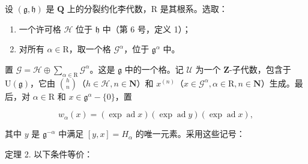设 \((\mathfrak{g},\mathfrak{h})\) 是 \(\mathbf{Q}\) 上的分裂约化李代数，\(\mathrm{R}\) 是其根系。选取：

\begin{enumerate}
\def\labelenumi{\alph{enumi})}
\item
  一个许可格 \(\mathcal{H}\) 位于 \(\mathfrak{h}\) 中（第 6 号，定义 1）；
\item
  对所有 \(\alpha \in \mathrm{R}\)，取一个格 \(\mathcal{G}^{\alpha}\)，位于 \(\mathfrak{g}^{\alpha}\) 中。
\end{enumerate}

置 \(\mathcal{G} = \mathcal{H} \oplus \sum_{\alpha \in \mathrm{R}} \mathcal{G}^{\alpha}\)。这是 \(\mathfrak{g}\) 中的一个格。记 \(\mathcal{U}\) 为一个 \(\mathbf{Z}\)-子代数，包含于 \(\mathrm{U}(\mathfrak{g})\)，它由 \(\binom{h}{n}\)（\(h \in \mathcal{H}, n \in \mathbf{N}\)）和 \(x^{(n)}\)（\(x \in \mathcal{G}^{\alpha}, \alpha \in \mathrm{R}, n \in \mathbf{N}\)）生成。最后，对 \(\alpha \in \mathrm{R}\) 和 \(x \in \mathfrak{g}^{\alpha} - \{0\}\)，置

\[
w _ {\alpha} (x) = (\exp \operatorname{ad} x) (\exp \operatorname{ad} y) (\exp \operatorname{ad} x),
\]

其中 \(y\) 是 \(\mathfrak{g}^{-\alpha}\) 中满足 \([y,x] = H_{\alpha}\) 的唯一元素。采用这些记号：

定理 2. 以下条件等价：

